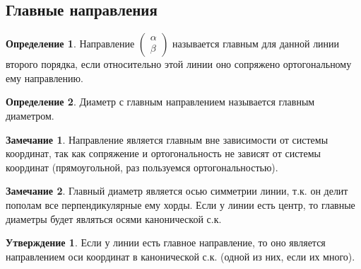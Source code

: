 \documentclass[a4paper, 12pt]{article}
\theoremstyle{definition}
\newtheorem*{definition}{Определение}
\newtheorem*{subtheorem}{Утверждение}
\newtheorem*{remark}{Замечание}
\begin{document}
	\subsection{Главные направления}
	\begin{definition}
		Направление $\begin{pmatrix} \alpha \\ \beta \end{pmatrix}$ называется главным для данной линии второго порядка, если относительно этой линии оно сопряжено ортогональному ему направлению. 
	\end{definition}
	\begin{definition}
		Диаметр с главным направлением называется главным диаметром.
	\end{definition}
	\begin{remark}
		Направление является главным вне зависимости от системы координат, так как сопряжение и ортогональность не зависят от системы координат (прямоугольной, раз пользуемся ортогональностью).
	\end{remark}
	\begin{remark}
		Главный диаметр является осью симметрии линии, т.к. он делит пополам все перпендикулярные ему хорды. Если у линии есть центр, то главные диаметры будет являться осями канонической с.к.
	\end{remark}
	\begin{subtheorem}
		Если у линии есть главное направление, то оно является направлением оси координат в канонической с.к. (одной из них, если их много).
	\end{subtheorem}
\end{document}
